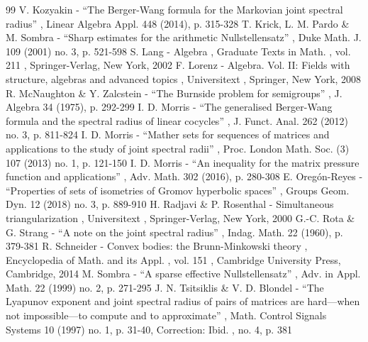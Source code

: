\documentclass[11pt]{article}
\theoremstyle{plain}
\theoremstyle{definition}
\begin{document}
\begin{thebibliography}{99}
 V. Kozyakin - “The Berger-Wang formula for the Markovian joint spectral radius” , Linear Algebra Appl. 448 (2014), p. 315-328
 T. Krick, L. M. Pardo \& M. Sombra - “Sharp estimates for the arithmetic Nullstellensatz” , Duke Math. J. 109 (2001) no. 3, p. 521-598
 S. Lang - Algebra , Graduate Texts in Math. , vol. 211 , Springer-Verlag, New York, 2002
 F. Lorenz - Algebra. Vol. II: Fields with structure, algebras and advanced topics , Universitext , Springer, New York, 2008
 R. McNaughton \& Y. Zalcstein - “The Burnside problem for semigroups” , J. Algebra 34 (1975), p. 292-299
 I. D. Morris - “The generalised Berger-Wang formula and the spectral radius of linear cocycles” , J. Funct. Anal. 262 (2012) no. 3, p. 811-824
 I. D. Morris - “Mather sets for sequences of matrices and applications to the study of joint spectral radii” , Proc. London Math. Soc. (3) 107 (2013) no. 1, p. 121-150
 I. D. Morris - “An inequality for the matrix pressure function and applications” , Adv. Math. 302 (2016), p. 280-308
 E. Oregón-Reyes - “Properties of sets of isometries of Gromov hyperbolic spaces” , Groups Geom. Dyn. 12 (2018) no. 3, p. 889-910
 H. Radjavi \& P. Rosenthal - Simultaneous triangularization , Universitext , Springer-Verlag, New York, 2000
 G.-C. Rota \& G. Strang - “A note on the joint spectral radius” , Indag. Math. 22 (1960), p. 379-381
 R. Schneider - Convex bodies: the Brunn-Minkowski theory , Encyclopedia of Math. and its Appl. , vol. 151 , Cambridge University Press, Cambridge, 2014
 M. Sombra - “A sparse effective Nullstellensatz” , Adv. in Appl. Math. 22 (1999) no. 2, p. 271-295
 J. N. Tsitsiklis \& V. D. Blondel - “The Lyapunov exponent and joint spectral radius of pairs of matrices are hard—when not impossible—to compute and to approximate” , Math. Control Signals Systems 10 (1997) no. 1, p. 31-40, Correction: Ibid. , no. 4, p. 381
\end{thebibliography}
\end{document}
